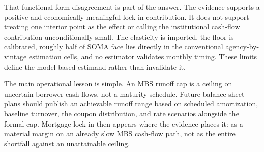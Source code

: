 That functional-form disagreement is part of the answer. The evidence supports a positive and economically meaningful lock-in contribution. It does not support treating one interior point as the effect or calling the institutional cash-flow contribution unconditionally small. The elasticity is imported, the floor is calibrated, roughly half of SOMA face lies directly in the conventional agency-by-vintage estimation cells, and no estimator validates monthly timing. These limits define the model-based estimand rather than invalidate it.

The main operational lesson is simple. An MBS runoff cap is a ceiling on uncertain borrower cash flows, not a maturity schedule. Future balance-sheet plans should publish an achievable runoff range based on scheduled amortization, baseline turnover, the coupon distribution, and rate scenarios alongside the formal cap. Mortgage lock-in then appears where the evidence places it: as a material margin on an already slow MBS cash-flow path, not as the entire shortfall against an unattainable ceiling.
